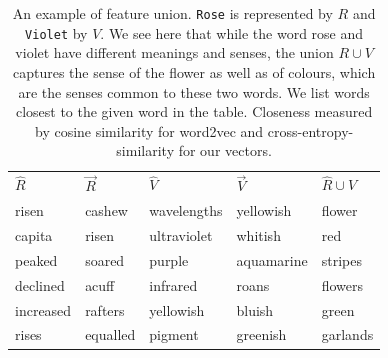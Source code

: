 \documentclass[11pt]{book}
\begin{document}
\begin{table}
  \centering
  {\scriptsize
  \begin{tabular}{l l l l l}
      $\hat R$    & $\vec R$ & $\hat V$       & $\vec V$  & $\hat R \cup \hat V$  \\
      risen       & cashew   & wavelengths    & yellowish & flower                \\
      capita      & risen    & ultraviolet    & whitish   & red                   \\ 
      peaked      & soared   & purple         & aquamarine& stripes               \\
      declined    & acuff    & infrared       & roans     & flowers               \\
      increased   & rafters  & yellowish      & bluish    & green                 \\    
      rises       & equalled & pigment        & greenish  & garlands              \\
  \end{tabular}
  }
  \caption{An example of feature union. \texttt{Rose} is represented by $R$
  and \texttt{Violet} by $V$. We see here that while the word rose and violet
  have different meanings and senses, the union $R \cup V$ captures the sense
  of the flower as well as of colours, which are the senses common to these
  two words. We list words closest to the given word in the table. Closeness
  measured by cosine similarity for word2vec and cross-entropy-similarity for
  our vectors.}
  \label{tab: union}
\end{table}
\end{document}

